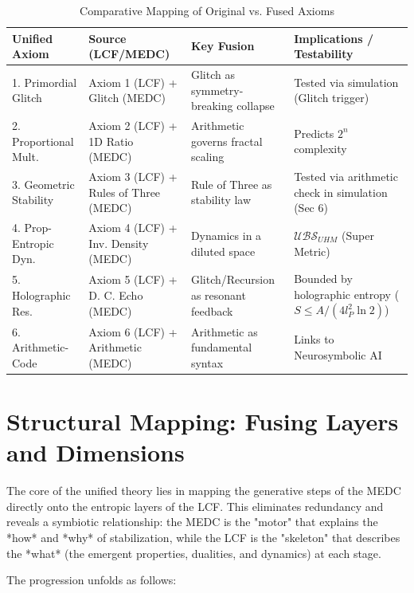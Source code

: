 \documentclass[11pt, a4paper]{article}
\begin{document}
		
		\begin{table}[H]
			\centering
			\caption{Comparative Mapping of Original vs. Fused Axioms}
			\label{tab:axiom_comparison}
			\footnotesize %
			\begin{tabular}{@{} p{3.2cm} p{2.5cm} p{3.5cm} p{4.5cm} @{}} %
				\toprule
				\textbf{Unified Axiom} & \textbf{Source (LCF/MEDC)} & \textbf{Key Fusion} & \textbf{Implications / Testability} \\ 
				\midrule
				1. Primordial Glitch & Axiom 1 (LCF) + Glitch (MEDC) & Glitch as symmetry-breaking collapse & Tested via simulation (Glitch trigger) \\
				2. Proportional Mult. & Axiom 2 (LCF) + 1D Ratio (MEDC) & Arithmetic governs fractal scaling & Predicts $2^n$ complexity \\
				3. Geometric Stability & Axiom 3 (LCF) + Rules of Three (MEDC) & Rule of Three as stability law & Tested via arithmetic check in simulation (Sec 6) \\
				4. Prop-Entropic Dyn. & Axiom 4 (LCF) + Inv. Density (MEDC) & Dynamics in a diluted space & $\mathcal{UBS}_{UHM}$ (Super Metric) \\
				5. Holographic Res. & Axiom 5 (LCF) + D. C. Echo (MEDC) & Glitch/Recursion as resonant feedback & Bounded by holographic entropy ($S \leq A/(4 l_P^2 \ln 2)$) \\
				6. Arithmetic-Code & Axiom 6 (LCF) + Arithmetic (MEDC) & Arithmetic as fundamental syntax & Links to Neurosymbolic AI \cite{Triadic} \\ 
				\bottomrule
			\end{tabular}
		\end{table}
		
		
		
		\section{Structural Mapping: Fusing Layers and Dimensions}
		
		The core of the unified theory lies in mapping the generative steps of the MEDC directly onto the entropic layers of the LCF. This eliminates redundancy and reveals a symbiotic relationship: the MEDC is the "motor" that explains the *how* and *why* of stabilization, while the LCF is the "skeleton" that describes the *what* (the emergent properties, dualities, and dynamics) at each stage.
		
		The progression unfolds as follows:
		
\end{document}
